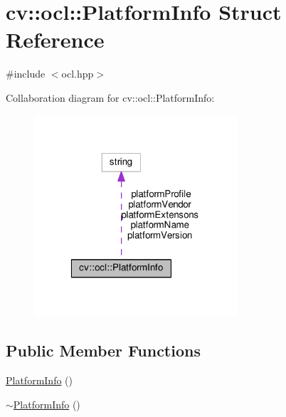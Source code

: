 \hypertarget{structcv_1_1ocl_1_1PlatformInfo}{\section{cv\-:\-:ocl\-:\-:Platform\-Info Struct Reference}
\label{structcv_1_1ocl_1_1PlatformInfo}
}


{\ttfamily \#include $<$ocl.\-hpp$>$}



Collaboration diagram for cv\-:\-:ocl\-:\-:Platform\-Info\-:\nopagebreak
\begin{figure}[H]
\begin{center}
\leavevmode
\includegraphics[width=214pt]{structcv_1_1ocl_1_1PlatformInfo__coll__graph}
\end{center}
\end{figure}
\subsection*{Public Member Functions}
\begin{DoxyCompactItemize}
\item 
\hyperlink{structcv_1_1ocl_1_1PlatformInfo_a16992a45eda7745828254c0aed74d843}{Platform\-Info} ()
\item 
\hyperlink{structcv_1_1ocl_1_1PlatformInfo_ae15231414bfeb251692f50e529f37fa7}{$\sim$\-Platform\-Info} ()
\end{DoxyCompactItemize}
